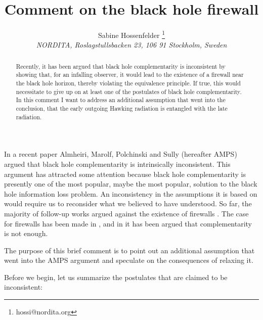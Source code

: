 \documentclass[11pt,twoside]{article}
\begin{document}
 
\title{Comment on the black hole firewall}
\author{Sabine Hossenfelder \thanks{hossi@nordita.org}\\
{\footnotesize{\sl NORDITA, Roslagstullsbacken 23, 106 91 Stockholm, Sweden}}}

\date{}
\maketitle
\vspace*{-1cm}
\begin{abstract}
Recently, it has been argued that black hole complementarity is inconsistent by
showing that, for an infalling observer, it would lead to the existence of a 
firewall near the black hole
horizon, thereby violating the equivalence principle. If true, this would necessitate
to give up on at least one of the postulates of black hole complementarity. In
this comment I want to address an additional assumption that went into the
conclusion, that the early outgoing Hawking radiation is entangled with the
late radiation. 
\end{abstract}



In a recent paper \cite{Almheiri:2012rt} Almheiri, Marolf, Polchinski and Sully (hereafter AMPS) argued
that black hole complementarity \cite{Susskind:1993if} is intrinsically inconsistent. This argument has attracted some
attention because black hole complementarity is presently one of the most popular, maybe the most popular,
solution to the black hole information loss problem. An inconsistency in the assumptions it is based
on would require us to reconsider what we believed to have understood. So far, the majority of follow-up works
argued against the existence of firewalls 
\cite{Nomura:2012sw,Mathur:2012jk,Chowdhury:2012vd,Bena:2012zi,Banks:2012nn,Ori:2012jx}.
The case for firewalls has been made in \cite{Susskind:2012rm}, and in \cite{Bousso:2012as} it has been 
argued that complementarity is not enough. 

The purpose of this brief comment is
to point out an additional assumption that went into the AMPS argument and speculate on the consequences
of relaxing it. 

Before we begin, let us summarize the postulates that are claimed to be inconsistent:
 
\end{document}
